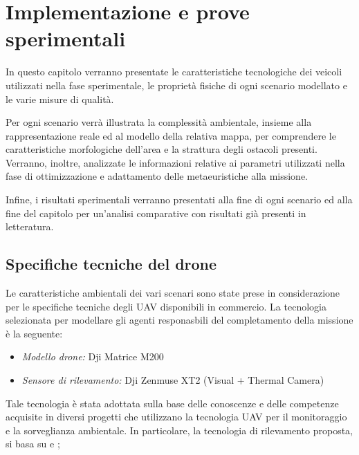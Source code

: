 \chapter{Implementazione e prove sperimentali}

In questo capitolo verranno presentate le caratteristiche tecnologiche dei veicoli utilizzati nella fase sperimentale, le proprietà fisiche di ogni scenario modellato e le varie misure di qualità.

Per ogni scenario verrà illustrata la complessità ambientale, insieme alla rappresentazione reale ed al modello della relativa mappa, per comprendere le caratteristiche morfologiche dell'area e la strattura degli ostacoli presenti.
Verranno, inoltre, analizzate le informazioni relative ai parametri utilizzati nella fase di ottimizzazione e adattamento delle metaeuristiche alla missione.
 
Infine, i risultati sperimentali verranno presentati alla fine di ogni scenario ed alla fine del capitolo per un'analisi comparative con risultati già presenti in letteratura.

\section{Specifiche tecniche del drone}

Le caratteristiche ambientali dei vari scenari sono state prese in considerazione per le specifiche tecniche degli UAV disponibili in commercio. 
La tecnologia selezionata per modellare gli agenti responasbili del completamento della missione è la seguente:
\begin{itemize}
    \item \textit{Modello drone:} Dji Matrice M200
    \item \textit{Sensore di rilevamento:} Dji Zenmuse XT2 (Visual + Thermal Camera) 
\end{itemize}
Tale tecnologia è stata adottata sulla base delle conoscenze e delle competenze acquisite in diversi progetti che utilizzano la tecnologia UAV per il monitoraggio e la sorveglianza ambientale. 
In particolare, la tecnologia di rilevamento proposta, si basa su \cite{persechino2010aerospace} e \cite{lega2012using};


